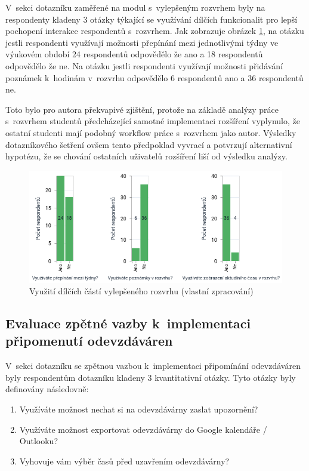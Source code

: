 V~sekci dotazníku zaměřené na modul s~vylepšeným rozvrhem byly na respondenty kladeny 3 otázky týkající se využívání dílčích funkcionalit pro lepší pochopení interakce respondentů s~rozvrhem. Jak zobrazuje obrázek \ref{fig:timetable-feedback}, na otázku jestli respondenti využívají možnosti přepínání mezi jednotlivými týdny ve výukovém období 24 respondentů odpovědělo že ano a 18 respondentů odpovědělo že ne. Na otázku jestli respondenti využívají možnosti přidávání poznámek k~hodinám v~rozvrhu odpovědělo 6 respondentů ano a 36 respondentů ne. 

Toto bylo pro autora překvapivé zjištění, protože na základě analýzy práce s~rozvrhem studentů předcházející samotné implementaci rozšíření vyplynulo, že ostatní studenti mají podobný workflow práce s~rozvrhem jako autor. Výsledky dotazníkového šetření ovšem tento předpoklad vyvrací a potvrzují alternativní hypotézu, že se chování ostatních uživatelů rozšíření liší od výsledku analýzy.

\begin{figure}[htbp!]\centering
    \includegraphics[width=\textwidth]{img/timetable.png}
    \caption{Využití dílčích částí vylepšeného rozvrhu (vlastní zpracování)}
    \label{fig:timetable-feedback}
\end{figure}

\subsection{Evaluace zpětné vazby k~implementaci připomenutí odevzdáváren}


V~sekci dotazníku se zpětnou vazbou k~implementaci připomínání odevzdáváren byly respondentům dotazníku kladeny 3 kvantitativní otázky. Tyto otázky byly definovány následovně:

\begin{enumerate}
    \item Využíváte možnost nechat si na odevzdávárny zaslat upozornění?
    \item Využíváte možnost exportovat odevzdávárny do Google kalendáře / Outlooku?
    \item Vyhovuje vám výběr časů před uzavřením odevzdávárny?
\end{enumerate}

